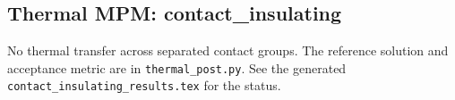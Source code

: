 \subsection{Thermal MPM: contact\_insulating}
No thermal transfer across separated contact groups. The reference solution and acceptance metric are in \texttt{thermal\_post.py}. See the generated \texttt{contact\_insulating\_results.tex} for the status.
